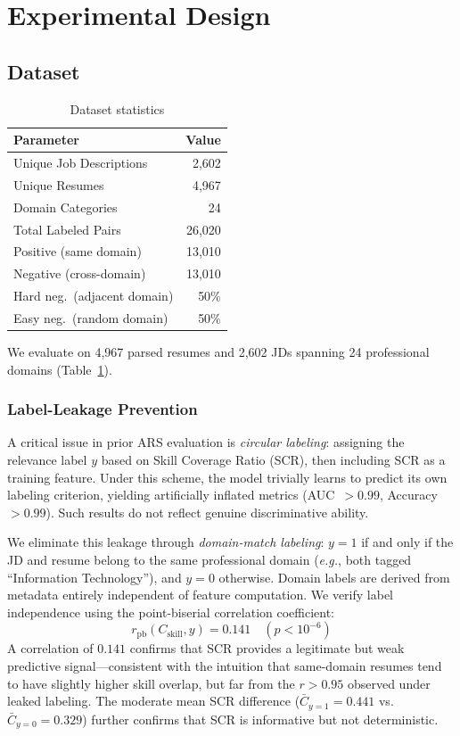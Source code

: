 \documentclass[smallcondensed,numbers]{sn-jnl}
\begin{document}
\section{Experimental Design}
\label{sec:experiment}

\subsection{Dataset}

\begin{table}[t]
\centering
\caption{Dataset statistics}
\label{tab:dataset}
\begin{tabular}{lr}
\toprule
Parameter & Value \\
\midrule
Unique Job Descriptions & 2,602 \\
Unique Resumes & 4,967 \\
Domain Categories & 24 \\
Total Labeled Pairs & 26,020 \\
Positive (same domain) & 13,010 \\
Negative (cross-domain) & 13,010 \\
\quad Hard neg.\ (adjacent domain) & 50\% \\
\quad Easy neg.\ (random domain) & 50\% \\
\bottomrule
\end{tabular}
\end{table}

We evaluate on 4,967 parsed resumes and 2,602 JDs spanning 24 professional domains (Table~\ref{tab:dataset}).

\subsubsection{Label-Leakage Prevention}
A critical issue in prior ARS evaluation is \textit{circular labeling}: assigning the relevance label $y$ based on Skill Coverage Ratio (SCR), then including SCR as a training feature. Under this scheme, the model trivially learns to predict its own labeling criterion, yielding artificially inflated metrics (AUC~$> 0.99$, Accuracy~$> 0.99$). Such results do not reflect genuine discriminative ability.

We eliminate this leakage through \textit{domain-match labeling}: $y{=}1$ if and only if the JD and resume belong to the same professional domain (\textit{e.g.}, both tagged ``Information Technology''), and $y{=}0$ otherwise. Domain labels are derived from metadata entirely independent of feature computation. We verify label independence using the point-biserial correlation coefficient:
\begin{equation}
    r_{\mathrm{pb}}(C_{\mathrm{skill}}, y) = 0.141 \quad (p < 10^{-6})
\end{equation}
A correlation of $0.141$ confirms that SCR provides a legitimate but weak predictive signal---consistent with the intuition that same-domain resumes tend to have slightly higher skill overlap, but far from the $r > 0.95$ observed under leaked labeling. The moderate mean SCR difference ($\bar{C}_{y=1} = 0.441$ vs.\ $\bar{C}_{y=0} = 0.329$) further confirms that SCR is informative but not deterministic.
\end{document}
